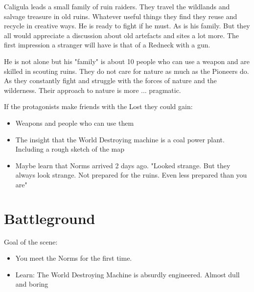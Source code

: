 \begin{npcBox}[title=Caligula]
    \begin{consequences}
    \item {}
    \item {}
    \item {}
    \end{consequences}

    \begin{npcDescription}
    Caligula leads a small family of ruin raiders. They travel the wildlands and salvage treasure in old ruins. Whatever useful things they find they reuse and recycle in creative ways.
    He is ready to fight if he must. As is his family. But they all would appreciate a discussion about old artefacts and sites a lot more. The first impression a stranger will have is that of a Redneck with a gun.
    \end{npcDescription}

    \end{npcBox}

He is not alone but his "family" is about 10 people who can use a weapon and are skilled in scouting ruins. They do not care for nature as much as the Pioneers do. As they constantly fight and struggle with the forces of nature and the wilderness. Their approach to nature is more ... pragmatic.

If the protagonists make friends with the Lost they could gain:

\begin{itemize}
    \item Weapons and people who can use them
    \item The insight that the World Destroying machine is a coal power plant. Including a rough sketch of the map
    \item Maybe learn that Norms arrived 2 days ago. "Looked strange. But they always look strange. Not prepared for the ruins. Even less prepared than you are"
\end{itemize}

\section{Battleground}

Goal of the scene:

\begin{itemize}
\item You meet the Norms for the first time.
\item Learn: The World Destroying Machine is absurdly engineered. Almost dull and boring
\end{itemize}

